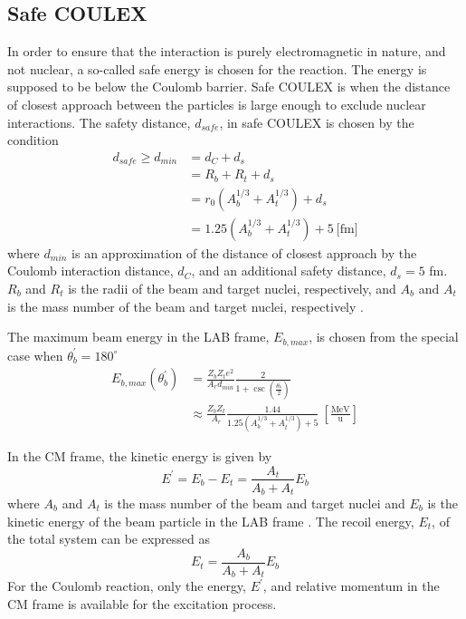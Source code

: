 \documentclass[twoside,english]{uiofysmaster/uiofysmaster}
\newcommand{\Sm}{$^{140}$Sm} %
\newcommand{\Pb}{$^{208}$Pb}
\begin{document}
\subsection{Safe COULEX}
In order to ensure that the interaction is purely electromagnetic in nature, and not nuclear, a so-called safe energy is chosen for the reaction. 
The energy is supposed to be below the Coulomb barrier.
Safe COULEX is when the distance of closest approach between the particles is large enough to exclude nuclear interactions.
The safety distance, $d_{safe}$, in safe COULEX is chosen by the condition
\begin{align}
	d_{safe} \geq d_{min} &= d_C + d_s \nonumber \\
	&= R_b + R_t + d_s \nonumber \\
	&= r_0 (A_b^{1/3} + A_t^{1/3}) + d_s \nonumber \\
	&= 1.25 (A_b^{1/3} + A_t^{1/3}) + 5~\text{[fm]}
\end{align}
where $d_{min}$ is an approximation of the distance of closest approach by the Coulomb interaction distance, $d_C$, and an additional safety distance, $d_s = 5$ fm.
$R_b$ and $R_t$ is the radii of the beam and target nuclei, respectively, and $A_b$ and $A_t$ is the mass number of the beam and target nuclei, respectively \cite{RBass, Cline1986}.

The maximum beam energy in the LAB frame, $E_{b, max}$, is chosen from the special case when $\theta_b^{'} = 180^\circ$ \cite{Klintefjord, RBass}
\begin{align}
	E_{b, max} (\theta_b^{'})
	&= \frac{Z_b Z_t e^2}{A_r d_{min}} \frac{2}{1 + \csc \left( \frac{\theta_b^{'}}{2} \right)} \\
	&\approx \frac{Z_b Z_t}{A_r} \frac{1.44}{1.25 (A_b^{1/3} + A_t^{1/3}) + 5} ~\left[ \tfrac{\text{MeV}}{\text{u}} \right]
\end{align}


In the CM frame, the kinetic energy is given by
\begin{equation}
	E^{'} = E_b - E_t = \frac{A_t}{A_b + A_t} E_{b}
\end{equation}
where $A_b$ and $A_t$ is the mass number of the beam and target nuclei and $E_{b}$ is the kinetic energy of the beam particle in the LAB frame \cite{Niedermaier, NaR}.
The recoil energy, $E_t$, of the total system can be expressed as
\begin{equation}
	E_t = \frac{A_b}{A_b + A_t} E_b
\end{equation}
For the Coulomb reaction, only the energy, $E^{'}$, and relative momentum in the CM frame is available for the excitation process. 
\end{document}
